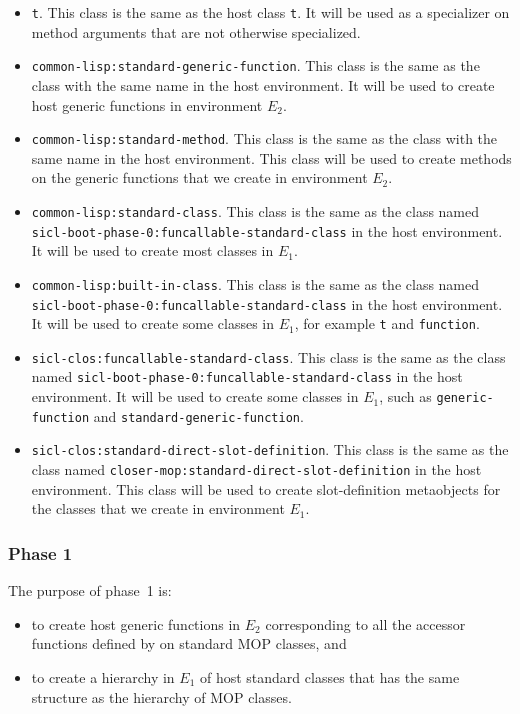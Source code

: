 \begin{itemize}
\item \texttt{t}.  This class is the same as the host class
  \texttt{t}.  It will be used as a specializer on method arguments
  that are not otherwise specialized.
\item \texttt{common-lisp:standard-generic-function}.  This class is
  the same as the class with the same name in the host environment.
  It will be used to create host generic functions in environment
  $E_2$.
\item \texttt{common-lisp:standard-method}.  This class is
  the same as the class with the same name in the host environment.
  This class will be used to create methods on the generic functions
  that we create in environment $E_2$.
\item \texttt{common-lisp:standard-class}.  This class is the same as
  the class named
  \texttt{sicl-boot-phase-0:funcallable-standard-class} in the host
  environment.  It will be used to create most classes in $E_1$.
\item \texttt{common-lisp:built-in-class}.  This class is the same as
  the class named
  \texttt{sicl-boot-phase-0:funcallable-standard-class} in the host
  environment.  It will be used to create some classes in $E_1$, for
  example \texttt{t} and \texttt{function}.
\item \texttt{sicl-clos:funcallable-standard-class}.  This class is
  the same as the class named
  \texttt{sicl-boot-phase-0:funcallable-standard-class} in the host
  environment.  It will be used to create some classes in $E_1$, such
  as \texttt{generic-function} and \texttt{standard-generic-function}.
\item \texttt{sicl-clos:standard-direct-slot-definition}.  This class
  is the same as the class named
  \texttt{closer-mop:standard-direct-slot-definition} in the host
  environment.  This class will be used to create slot-definition
  metaobjects for the classes that we create in environment $E_1$.
\end{itemize}

\subsubsection{Phase 1}

The purpose of phase~1 is:

\begin{itemize}
\item to create host generic functions in $E_2$ corresponding to all
  the accessor functions defined by \sysname{} on standard MOP
  classes, and
\item to create a hierarchy in $E_1$ of host standard classes that has
  the same structure as the hierarchy of MOP classes.
\end{itemize}


